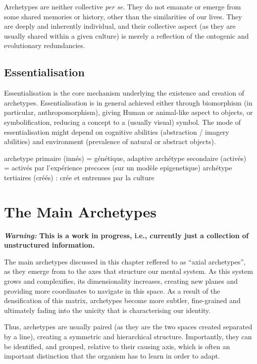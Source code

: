 \documentclass[
]{book}
\begin{document}
Archetypes are neither collective \emph{per se}. They do not emanate or emerge from some shared memories or history, other than the similarities of our lives. They are deeply and inherently individual, and their collective aspect (as they are usually shared within a given culture) is merely a reflection of the ontogenic and evolutionary redundancies.

\hypertarget{essentialisation}{%
\section{Essentialisation}\label{essentialisation}}

Essentialisation is the core mechanism underlying the existence and creation of archetypes. Essentialisation is in general achieved either through biomorphism (in particular, anthropomorphism), giving Human or animal-like aspect to objects, or symbolification, reducing a concept to a (usually visual) symbol. The mode of essentialisation might depend on cognitive abilities (abstraction / imagery abilities) and environment (prevalence of natural or abstract objects).

archetype primaire (innés) = génétique, adaptive
archétype secondaire (activés) = activés par l'expérience precoces (sur un modèle epigenetique)
archétype tertiaires (créés) : crée et entrenues par la culture

\hypertarget{the-main-archetypes}{%
\chapter{The Main Archetypes}\label{the-main-archetypes}}

\textbf{\emph{Warning:} This is a work in progress, i.e., currently just a collection of unstructured information.}

The main archetypes discussed in this chapter reffered to as ``axial archetypes'', as they emerge from to the axes that structure our mental system. As this system grows and complexifies, its dimensionality increases, creating new planes and providing more coordinates to navigate in this space. As a result of the densification of this matrix, archetypes become more subtler, fine-grained and ultimately fading into the unicity that is characterising our identity.

Thus, archetypes are usually paired (as they are the two spaces created separated by a line), creating a symmetric and hierarchical structure. Importantly, they can be identified, and grouped, relative to their causing axis, which is often an important distinction that the organism has to learn in order to adapt.
\end{document}
